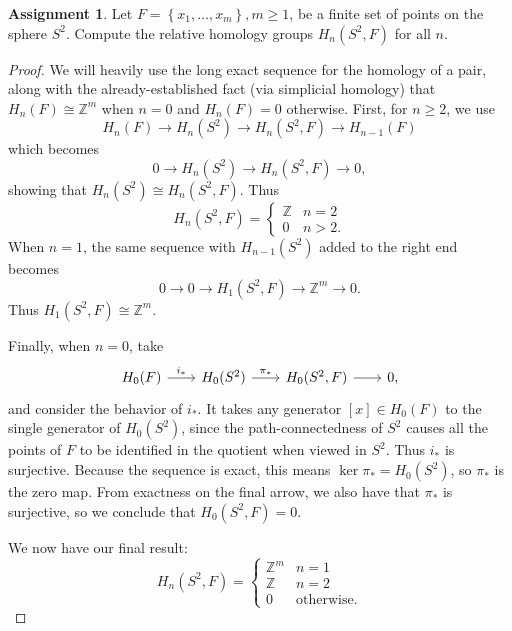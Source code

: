 \documentclass[12pt]{article}
\theoremstyle{definition}
\newtheorem{ex}{Assignment}
\begin{document}
\begin{ex}
	Let $F = \left\lbrace x_1, \dots, x_m \right\rbrace, m \geq 1$, be a finite set of points on the sphere $S^2$.
	Compute the relative homology groups $H_n(S^2, F)$ for all $n$.
\end{ex}
\begin{proof}
	We will heavily use the long exact sequence for the homology of a pair, along with the already-established fact (via simplicial homology) that $H_n(F) \cong \mathbb{Z}^m$ when $n = 0$ and $H_n(F) = 0$ otherwise.
	First, for $n \geq 2$, we use \begin{equation*}
		H_n(F) \to H_n(S^2) \to H_n(S^2, F) \to H_{n-1}(F)
	\end{equation*}
	which becomes
	\begin{equation*}
		0      \to H_n(S^2) \to H_n(S^2, F) \to 0,
	\end{equation*}
	showing that $H_n(S^2) \cong H_n(S^2, F)$.
	Thus \begin{equation*}
		H_n(S^2, F) = \begin{cases}
			\mathbb{Z} & n = 2  \\
			0          & n > 2.
		\end{cases}
	\end{equation*}
	When $n = 1$, the same sequence with $H_{n-1}(S^2)$ added to the right end becomes \begin{equation*}
		0 \to 0 \to H_1(S^2, F) \to \mathbb{Z}^m \to 0.
	\end{equation*}
	Thus $H_1(S^2, F) \cong \mathbb{Z}^m$.

	Finally, when $n = 0$, take \begin{equation*}
		\begin{tikzcd}[column sep=2em]
			H_0(F) \arrow[r, "i_*"] & H_0(S^2) \arrow[r, "\pi_*"] & H_0(S^2, F) \arrow[r] & 0,
		\end{tikzcd}
	\end{equation*}
	and consider the behavior of $i_*$.
	It takes any generator $[x] \in H_0(F)$ to the single generator of $H_0(S^2)$, since the path-connectedness of $S^2$ causes all the points of $F$ to be identified in the quotient when viewed in $S^2$.
	Thus $i_*$ is surjective.
	Because the sequence is exact, this means $\ker\pi_* = H_0(S^2)$, so $\pi_*$ is the zero map.
	From exactness on the final arrow, we also have that $\pi_*$ is surjective, so we conclude that $H_0(S^2, F) = 0$.

	We now have our final result: \begin{equation*}
		H_n(S^2, F) = \begin{cases}
			\mathbb{Z}^m & n = 1             \\
			\mathbb{Z}   & n = 2             \\
			0            & \text{otherwise.}
		\end{cases}
	\end{equation*}
\end{proof}
\end{document}
